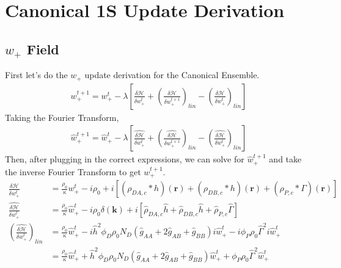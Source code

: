 \documentclass{article}
\begin{document}
  
  \section{Canonical 1S Update Derivation}
  
  \subsection{$w_+$ Field}
  
  First let's do the $w_+$ update derivation for the Canonical Ensemble.
  \begin{align*}
    w_+^{t+1} =
      w_+^t - \lambda \left[
        \frac{\delta \mathcal{H}}{\delta w_+^t}
        + \left(  \frac{\delta \mathcal{H}}{\delta w_+^{t+1}} \right) _{lin}
        - \left(  \frac{\delta \mathcal{H}}{\delta w_+^{t}} \right) _{lin}
      \right]
  \end{align*}
  Taking the Fourier Transform,
  \begin{align*}
    \hat{w}_+^{t+1} =
      \hat{w}_+^t - \lambda \left[
        \hat{\frac{\delta \mathcal{H}}{\delta w_+^t}}
        + \left( \hat{ \frac{\delta \mathcal{H}}{\delta w_+^{t+1}}} \right) _{lin}
        - \left( \hat{ \frac{\delta \mathcal{H}}{\delta w_+^{t}}} \right) _{lin}
      \right]
  \end{align*}
  Then, after plugging in the correct expressions, we can solve for
    $\hat{w}_+^{t+1}$ and take the inverse Fourier Transform to get $w_+^{t+1}$.
  \begin{align*}
    \frac{\delta \mathcal{H}}{\delta w_+^t} &=
      \frac{\rho_0}{\kappa} w_+^t
      - i\rho_0
      + i [ (\rho_{DA,c} \ast h)(\mathbf{r})
            + (\rho_{DB,c} \ast h)(\mathbf{r})
            + (\rho_{P,c} \ast \Gamma)(\mathbf{r}) ] \\
    \hat{\frac{\delta \mathcal{H}}{\delta w_+^t}} &=
      \frac{\rho_0}{\kappa} \hat{w}_+^t
      - i \rho_0 \delta(\mathbf{k})
      + i [ \hat{\rho}_{DA,c} \hat{h}
            + \hat{\rho}_{DB,c} \hat{h}
            + \hat{\rho}_{P,c}  \hat{\Gamma} ] \\
    \left( \hat{\frac{\delta \mathcal{H}}{\delta w_+^t}} \right) _{lin} &=
      \frac{\rho_0}{\kappa} \hat{w}_+^t
      - i \hat{h}^2 \phi_D \rho_0 N_D
        (\hat{g}_{AA} + 2 \hat{g}_{AB} + \hat{g}_{BB}) i \hat{w}_+^t
      - i \phi_P \rho_0 \hat{\Gamma}^2 i \hat{w}_+^t \\
    &= \frac{\rho_0}{\kappa} \hat{w}_+^t
      + \hat{h}^2 \phi_D \rho_0 N_D
        (\hat{g}_{AA} + 2 \hat{g}_{AB} + \hat{g}_{BB}) \hat{w}_+^t
      + \phi_P \rho_0 \hat{\Gamma}^2 \hat{w}_+^t
  \end{align*}
\end{document}
